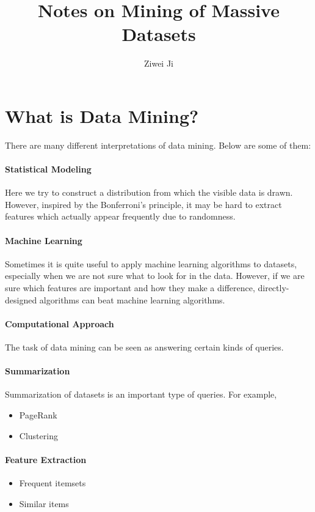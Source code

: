 \documentclass{article}
\title{Notes on Mining of Massive Datasets}
\author{Ziwei Ji}
\begin{document}
\maketitle

\section*{What is Data Mining?}
There are many different interpretations of data mining. Below are some of them:
\paragraph{Statistical Modeling} 
Here we try to construct a distribution from which the visible data is drawn. However, inspired by the Bonferroni's principle, it may be hard to extract features which actually appear frequently due to randomness.

\paragraph{Machine Learning}
Sometimes it is quite useful to apply machine learning algorithms to datasets, especially when we are not sure what to look for in the data. However, if we are sure which features are important and how they make a difference, directly-designed algorithms can beat machine learning algorithms.

\paragraph{Computational Approach}
The task of data mining can be seen as answering certain kinds of queries.

\paragraph{Summarization}
Summarization of datasets is an important type of queries. For example,
\begin{itemize}
\item PageRank
\item Clustering
\end{itemize}

\paragraph{Feature Extraction}
\begin{itemize}
\item Frequent itemsets
\item Similar items
\end{itemize}
\end{document}
